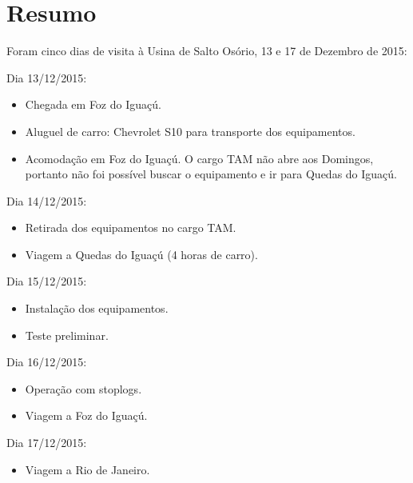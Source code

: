 \section{Resumo}
Foram cinco dias de visita à Usina de Salto Osório, 13 e 17 de Dezembro de 2015:

Dia 13/12/2015:
\begin{itemize}
  \item Chegada em Foz do Iguaçú.
  \item Aluguel de carro: Chevrolet S10 para transporte dos equipamentos.
  \item Acomodação em Foz do Iguaçú. O cargo TAM não abre aos Domingos, portanto
  não foi possível buscar o equipamento e ir para Quedas do Iguaçú.
\end{itemize}

Dia 14/12/2015:
\begin{itemize}
  \item Retirada dos equipamentos no cargo TAM.
  \item Viagem a Quedas do Iguaçú (4 horas de carro).
\end{itemize}

Dia 15/12/2015:
\begin{itemize}
  \item Instalação dos equipamentos.
  \item Teste preliminar.
\end{itemize}

Dia 16/12/2015:
\begin{itemize}
  \item Operação com stoplogs.
  \item Viagem a Foz do Iguaçú.
\end{itemize}

Dia 17/12/2015:
\begin{itemize}
  \item Viagem a Rio de Janeiro.
\end{itemize}